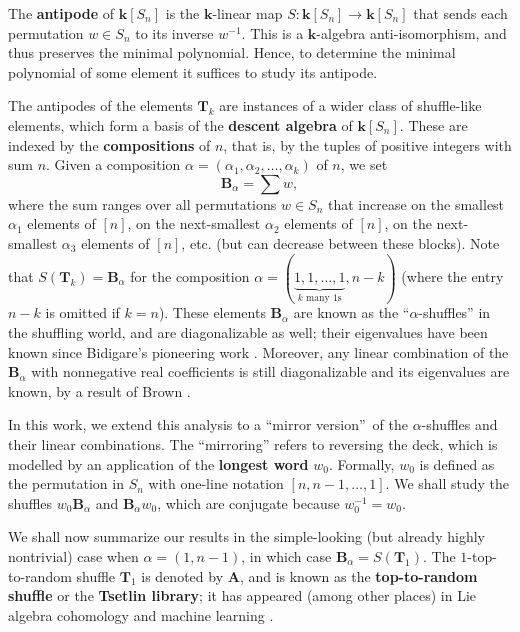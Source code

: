 \documentclass[12pt]{article}
\theoremstyle{definition}%
\theoremstyle{definition}%
\theoremstyle{remark}%
\newcommand{\tup}[1]{\left( #1 \right)}
\newcommand{\interval}[1]{\left[ #1 \right]} %
\newcommand{\ponl}[1]{\left[ #1 \right]} %
\newcommand{\kk}{\mathbf{k}}
\newcommand{\ksn}{\kk\left[S_n\right]}
\newcommand{\A}{\mathbf{A}}
\newcommand{\BBa}{\mathbf{B}_{\alpha}}
\newcommand{\TT}{\mathbf{T}}
\newcommand{\wo}{w_0} %
\newcommand{\defin}[1]{\textbf{#1}}
\begin{document}
The \defin{antipode} of $ \ksn $ is the $ \kk $-linear map $ S : \ksn \to \ksn $ that sends each permutation $ w \in S_{n} $ to its inverse $ w^{-1} $.
This is a $ \kk $-algebra anti-isomorphism, and thus preserves the minimal polynomial.
Hence, to determine the minimal polynomial of some element it suffices to study its antipode.

The antipodes of the elements $\TT_k$ are instances of a wider class of shuffle-like elements, which form a basis of the \defin{descent algebra} of $\ksn$.
These are indexed by the \defin{compositions} of $n$, that is, by the tuples of positive integers with sum $n$.
Given a composition $\alpha = \tup{\alpha_1, \alpha_2, \ldots, \alpha_k}$ of $n$, we set
\[
\BBa = \sum w,
\]
where the sum ranges over all permutations $w \in S_n$ that increase on the smallest $\alpha_1$ elements of $\interval{n}$, on the next-smallest $\alpha_2$ elements of $\interval{n}$, on the next-smallest $\alpha_3$ elements of $\interval{n}$, etc. (but can decrease between these blocks).
Note that $S\tup{ \TT_k } = \BBa$ for the composition $\alpha = \tup{\underbrace{1, 1, \ldots, 1}_{k \text{ many $1$s}}, n-k}$ (where the entry $n-k$ is omitted if $k=n$).
These elements $\BBa$ are known as the ``$\alpha$-shuffles'' in the shuffling world, and are diagonalizable as well; their eigenvalues have been known since Bidigare's pioneering work \cite[\S 4.1.9]{Bidigare-thesis}.
Moreover, any linear combination of the $\BBa$ with nonnegative real coefficients is still diagonalizable and its eigenvalues are known, by a result of Brown \cite[Theorem 4.1]{Schocker}.

In this work, we extend this analysis to a ``mirror version''\ of the $\alpha$-shuffles and their linear combinations.
The ``mirroring'' refers to reversing the deck, which is modelled by an application of the \defin{longest word} $\wo$.
Formally, $\wo$ is defined as the permutation in $S_n$ with one-line notation $ \ponl{ n,n-1,\dots,1 } $.
We shall study the shuffles $ \wo\BBa $ and $ \BBa\wo $, which are conjugate because $\wo^{-1} = \wo$.

We shall now summarize our results in the simple-looking (but already highly nontrivial) case when $\alpha = \tup{1, n-1}$, in which case $\BBa = S\tup{ \TT_1 }$.
The $1$-top-to-random shuffle $\TT_1$ is denoted by $\A$, and is known as the \defin{top-to-random shuffle} or the \defin{Tsetlin library}; it has appeared (among other places) in Lie algebra cohomology \cite[Appendix]{Wallach} and machine learning \cite[Lemma 29]{Reizen19}.
\end{document}
